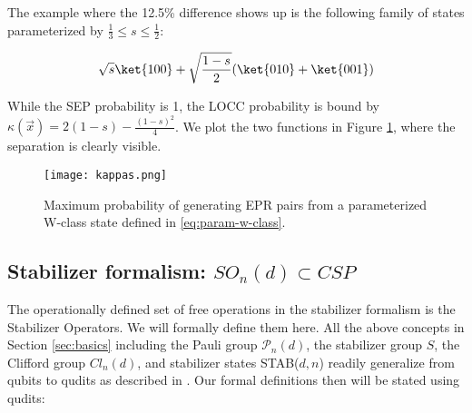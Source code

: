 The example where the 12.5\% difference shows up is the following family of states parameterized by $\frac{1}{3} \leq s \leq \frac{1}{2}$:

\begin{align}
\sqrt{s} \ket{100} + \sqrt{\frac{1-s}{2}}(\ket{010}+\ket{001}) \label{eq:param-w-class}
\end{align}

While the SEP probability is 1, the LOCC probability is bound by $\kappa(\vec{x}) = 2(1-s)-\frac{(1-s)^2}{4}$. We plot the two functions in Figure \ref{fig:kappas}, where the separation is clearly visible. 

\begin{figure}[!ht]
\center
\texttt{[image: kappas.png]}
\caption{Maximum probability of generating EPR pairs from a parameterized W-class state defined in \ref{eq:param-w-class}.}
\label{fig:kappas}
\end{figure}


\subsection{Stabilizer formalism: $SO_n(d) \subset CSP$ }

The operationally defined set of free operations in the stabilizer formalism is the Stabilizer Operators. We will formally define them here. All the above concepts in Section \ref{sec:basics} including the Pauli group $\mathcal{P}_n(d)$, the stabilizer group $S$, the Clifford group $Cl_n(d)$, and stabilizer states STAB($d,n$) readily generalize from qubits to qudits as described in  \cite{heimendahl_axiomatic_2022}. Our formal definitions then will be stated using qudits: 


